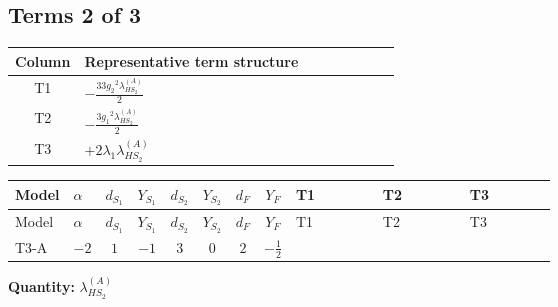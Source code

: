\documentclass[8pt]{article}
\begin{document}
\begin{landscape}
\subsection*{Terms 2 of 3}
\begin{center}
\begin{tabular}{@{}c >{\raggedright\arraybackslash}p{0.82\linewidth}@{}}
\toprule
Column & Representative term structure \\
\midrule
T1 & \(\displaystyle -\frac{33 {g_2}^2 {\lambda_{HS_2}^{(A)}}}{2}\) \\
\midrule
T2 & \(\displaystyle -\frac{3 {g_1}^2 {\lambda_{HS_2}^{(A)}}}{2}\) \\
\midrule
T3 & \(\displaystyle +2 {\lambda_1} {\lambda_{HS_2}^{(A)}}\) \\
\midrule
\bottomrule
\end{tabular}
\end{center}
\smallskip
\tiny
\begin{longtable}{@{}llcccccc >{\raggedright\arraybackslash}p{0.21\linewidth} >{\raggedright\arraybackslash}p{0.21\linewidth} >{\raggedright\arraybackslash}p{0.21\linewidth}@{}}
\toprule
Model & $\alpha$ & $d_{S_1}$ & $Y_{S_1}$ & $d_{S_2}$ & $Y_{S_2}$ & $d_F$ & $Y_F$ & T1 & T2 & T3 \\
\midrule
\endfirsthead
\toprule
Model & $\alpha$ & $d_{S_1}$ & $Y_{S_1}$ & $d_{S_2}$ & $Y_{S_2}$ & $d_F$ & $Y_F$ & T1 & T2 & T3 \\
\midrule
\endhead
T3-A & $-2$ & $1$ & $-1$ & $3$ & $0$ & $2$ & $-\frac{1}{2}$ & \scriptsize\adjustbox{max width=\linewidth}{$\begin{gathered} -\frac{33 {g_2}^2 {\lambda_{HS_2}^{(A)}}}{2}\end{gathered}$} & \scriptsize\adjustbox{max width=\linewidth}{$\begin{gathered} -\frac{3 {g_1}^2 {\lambda_{HS_2}^{(A)}}}{2}\end{gathered}$} & \scriptsize\adjustbox{max width=\linewidth}{$\begin{gathered} +2 {\lambda_1} {\lambda_{HS_2}^{(A)}}\end{gathered}$} \\
\midrule
\bottomrule
\end{longtable}
\clearpage
\noindent\textbf{Quantity: }$\lambda_{HS_2}^{(A)}$\par\smallskip

\end{landscape}
\end{document}
